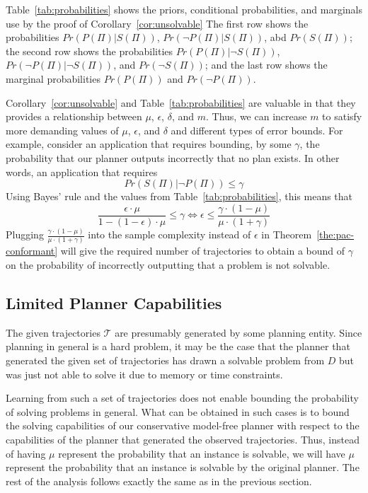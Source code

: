 \documentclass{article}
\newcommand{\solvable}{\textit{S}}
\newcommand{\plannable}{\textit{P}}
\begin{document}
Table~\ref{tab:probabilities} shows the priors, conditional probabilities, and marginals use by the proof of Corollary~\ref{cor:unsolvable}
The first row shows the probabilities 
	$Pr(\plannable(\Pi)|\solvable(\Pi))$, 
	$Pr(\neg\plannable(\Pi)|\solvable(\Pi))$, abd
	$Pr(\solvable(\Pi))$; 
	the second row shows the probabilities 
	$Pr(\plannable(\Pi)|\neg\solvable(\Pi))$, 
	$Pr(\neg\plannable(\Pi)|\neg\solvable(\Pi))$, and
	$Pr(\neg\solvable(\Pi))$;  	
	and the last row shows the marginal probabilities
	$Pr(\plannable(\Pi))$ and  
	$Pr(\neg\plannable(\Pi))$. 
	
	Corollary~\ref{cor:unsolvable} and Table~\ref{tab:probabilities} are valuable in that they provides a relationship between $\mu$, $\epsilon$, $\delta$, and $m$. Thus, we can increase $m$ to satisfy more demanding values of $\mu$, $\epsilon$, and $\delta$ and different types of error bounds. For example, consider an application that requires bounding, by some $\gamma$, the probability that our planner outputs incorrectly that no plan exists. In other words, an application that requires 
	\[ Pr(\solvable(\Pi)|\neg\plannable(\Pi))\leq \gamma \]
	Using Bayes' rule and the values from Table~\ref{tab:probabilities}, this means that 
	\[ \frac{\epsilon\cdot\mu}{1-(1-\epsilon)\cdot\mu}\leq \gamma \Leftrightarrow  \epsilon\leq \frac{\gamma\cdot (1-\mu)}{\mu\cdot (1+\gamma)}\]
	\noindent Plugging $\frac{\gamma\cdot (1-\mu)}{\mu\cdot (1+\gamma)}$ into the sample complexity instead of $\epsilon$ in Theorem~\ref{the:pac-conformant} will give the required number of trajectories to obtain a bound of  $\gamma$ on the probability of incorrectly outputting that a problem is not solvable. 
	
	\subsection{Limited Planner Capabilities}
	The given trajectories $\mathcal{T}$ are presumably generated by some planning entity. Since planning in general is a hard problem, it may be the case that the planner that generated the given set of trajectories has drawn a solvable problem from $D$ but was just not able to solve it due to memory or time constraints. 
	
	Learning from such a set of trajectories does not enable bounding the probability of solving problems in general. What can be obtained in such cases is to bound the solving capabilities of our conservative model-free planner with respect to the capabilities of the planner that generated the observed trajectories. Thus, instead of having $\mu$ represent the probability that an instance is solvable, we will have $\mu$ represent the probability that an instance is solvable by the original planner. The rest of the analysis follows exactly the same as in the previous section.
	
\end{document}
